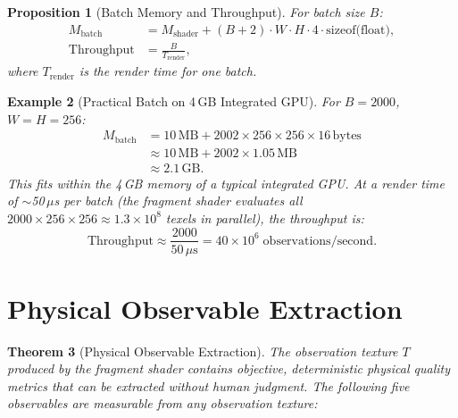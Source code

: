 \documentclass[11pt,twocolumn,a4paper]{article}
\newtheorem{theorem}{Theorem}[section]
\newtheorem{proposition}[theorem]{Proposition}
\newtheorem{example}[theorem]{Example}
\newcommand{\Mshader}{M_{\mathrm{shader}}}
\begin{document}
\begin{proposition}[Batch Memory and Throughput]
\label{prop:batch}
For batch size $B$:
\begin{align}
M_{\mathrm{batch}} &= \Mshader + (B + 2) \cdot W \cdot H
  \cdot 4 \cdot \text{sizeof(float)}, \\
\text{Throughput} &= \frac{B}{T_{\mathrm{render}}},
\label{eq:batch}
\end{align}
where $T_{\mathrm{render}}$ is the render time for one batch.
\end{proposition}

\begin{example}[Practical Batch on 4\,GB Integrated GPU]
For $B = 2000$, $W = H = 256$:
\begin{align}
M_{\mathrm{batch}} &= 10\,\text{MB}
  + 2002 \times 256 \times 256 \times 16\,\text{bytes}
\nonumber\\
&\approx 10\,\text{MB} + 2002 \times 1.05\,\text{MB}
\nonumber\\
&\approx 2.1\,\text{GB}.
\end{align}
This fits within the 4\,GB memory of a typical integrated GPU.
At a render time of $\sim$50\,$\mu$s per batch (the fragment shader
evaluates all $2000 \times 256 \times 256 \approx 1.3 \times 10^8$
texels in parallel), the throughput is:
\begin{equation}
\text{Throughput} \approx \frac{2000}{50\,\mu\text{s}}
  = 40 \times 10^6 \;\text{observations/second}.
\end{equation}
\end{example}



\section{Physical Observable Extraction}
\label{sec:observables}

\begin{theorem}[Physical Observable Extraction]
\label{thm:observables}
The observation texture $T$ produced by the fragment shader contains
objective, deterministic physical quality metrics that can be
extracted without human judgment. The following five observables are
measurable from any observation texture:
\end{theorem}
\end{document}
